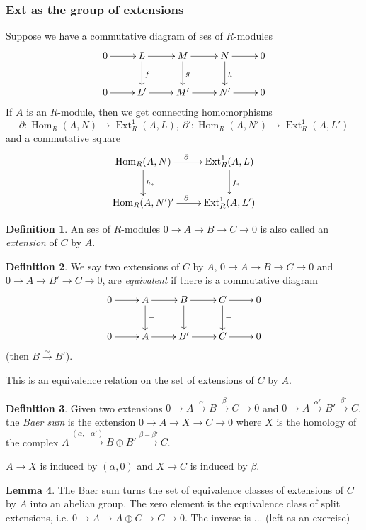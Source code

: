 \documentclass{article}
\newcommand{\Hom}{\operatorname{Hom}}
\newcommand{\Ext}{\operatorname{Ext}}
\theoremstyle{definition}
\newtheorem{defn}{Definition}[subsection]
\newtheorem{lemma}[defn]{Lemma}
\begin{document}
\subsubsection{Ext as the group of extensions}
Suppose we have a commutative diagram of ses of $R$-modules
\[
\xymatrix{
0\ar[r] & L\ar[r]\ar[d]^f & M\ar[r]\ar[d]^g & N\ar[r]\ar[d]^h & 0 \\
0\ar[r] & L'\ar[r] & M'\ar[r] & N'\ar[r] & 0 
}
\]
If $A$ is an $R$-module, then we get connecting homomorphisms
\[
\partial:\Hom_R(A,N)\rightarrow\Ext_R^1(A,L),\ \partial':\Hom_R(A,N')\rightarrow\Ext_R^1(A,L')
\]
and a commutative square
\[
\xymatrix{
\Hom_R(A,N)\ar[r]^\partial\ar[d]^{h_\ast} & \Ext_R^1(A,L)\ar[d]^{f_\ast} \\
\Hom_R(A,N')\ar[r]^\partial' & \Ext_R^1(A,L')
}
\]

\begin{defn}
An ses of $R$-modules $0\rightarrow A\rightarrow B\rightarrow C\rightarrow 0$ is also called an \textit{extension} of $C$ by $A$.
\end{defn}

\begin{defn}
We say two extensions of $C$ by $A$, $0\rightarrow A\rightarrow B\rightarrow C\rightarrow 0$ and $0\rightarrow A\rightarrow B'\rightarrow C\rightarrow 0$, are \textit{equivalent} if there is a commutative diagram
\[
\xymatrix{
0\ar[r] & A\ar[r]\ar[d]^= & B\ar[r]\ar[d] & C\ar[r]\ar[d]^= & 0 \\
0\ar[r] & A\ar[r] & B'\ar[r] & C\ar[r] & 0 
}
\]
(then $B\xrightarrow{\sim}B'$).

This is an equivalence relation on the set of extensions of $C$ by $A$.
\end{defn}

\begin{defn}
Given two extensions $0\rightarrow A\xrightarrow{\alpha} B\xrightarrow{\beta} C\rightarrow 0$ and $0\rightarrow A\xrightarrow{\alpha'} B'\xrightarrow{\beta'} C$, the \textit{Baer sum} is the extension $0\rightarrow A\rightarrow X\rightarrow C\rightarrow 0$ where $X$ is the homology of the complex $A\xrightarrow{(\alpha,-\alpha')}B\oplus B'\xrightarrow{\beta-\beta'}C$.

$A\rightarrow X$ is induced by $(\alpha,0)$ and $X\rightarrow C$ is induced by $\beta$.
\end{defn}

\begin{lemma}
The Baer sum turns the set of equivalence classes of extensions of $C$ by $A$ into an abelian group. The zero element is the equivalence class of split extensions, i.e. $0\rightarrow A\rightarrow A\oplus C\rightarrow C\rightarrow 0$. The inverse is ... (left as an exercise)
\end{lemma}
\end{document}

